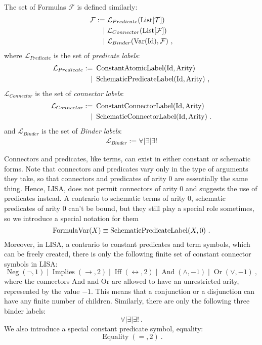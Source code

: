 \begin{definition}[Formulas]
  The set of Formulas $\mathcal{F}$ is defined similarly:
  \begin{align}
    \mathcal{F} := & ~\mathcal{L}_{Predicate}(\operatorname{List}[\mathcal{T}])                \\
    \mid           & ~\mathcal{L}_{Connector}(\operatorname{List}[\mathcal{F}])                \\
    \mid           & ~\mathcal{L}_{Binder}(\operatorname{Var}(\textnormal{Id}), \mathcal{F})~,
  \end{align}
  where $\mathcal{L}_{Predicate}$ is the set of \textit{predicate labels}:
  \begin{align}
    \mathcal{L}_{Predicate} := & ~\operatorname{ConstantAtomicLabel}(\textnormal{Id}, \textnormal{Arity})    \\
    \mid                       & ~\operatorname{SchematicPredicateLabel}(\textnormal{Id}, \textnormal{Arity})~,
  \end{align}
  $\mathcal{L}_{Connector}$ is the set of \textit{connector labels}:
  \begin{align}
    \mathcal{L}_{Connector} := & ~\operatorname{ConstantConnectorLabel}(\textnormal{Id}, \textnormal{Arity})    \\
    \mid                       & ~\operatorname{SchematicConnectorLabel}(\textnormal{Id}, \textnormal{Arity})~.
  \end{align}
  and $\mathcal{L}_{Binder}$ is the set of \textit{Binder labels}:
  \begin{align}
    \mathcal{L}_{Binder} := \forall \mid \exists \mid \exists!
  \end{align}

  Connectors and predicates, like terms, can exist in either constant or schematic forms. Note that connectors and predicates vary only in the type of arguments they take, so that connectors and predicates of arity 0 are essentially the same thing. Hence, LISA, does not permit connectors of arity 0 and suggests the use of predicates instead.
  A contrario to schematic terms of arity 0, schematic predicates of arity 0 can't be bound, but they still play a special role sometimes, so we introduce a special notation for them
  $$
    \operatorname{FormulaVar}(X) \equiv \operatorname{SchematicPredicateLabel}(X, 0)~.
  $$
  Moreover, in LISA, a contrario to constant predicates and term symbols, which can be freely created, there is only the following finite set of constant connector symbols in LISA:
  $$
    \operatorname{Neg}(\neg, 1)\mid \operatorname{Implies}(\rightarrow, 2)\mid \operatorname{Iff}(\leftrightarrow, 2)\mid \operatorname{And}(\land, -1)\mid \operatorname{Or}(\lor, -1)~,
  $$
  where the connectors And and Or are allowed to have an unrestricted arity, represented by the value $-1$. This means that a conjunction or a disjunction can have any finite number of children.
  Similarly, there are only the following three binder labels:
  $$
    \forall \mid \exists \mid \exists !~.
  $$
  We also introduce a special constant predicate symbol, equality:
  $$
    \operatorname{Equality}(=, 2)~.
  $$
\end{definition}
